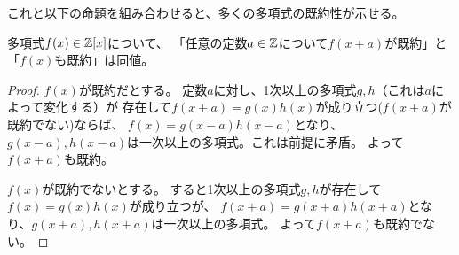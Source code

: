 \documentclass[a4j]{jarticle}
\begin{document}
これと以下の命題を組み合わせると、多くの多項式の既約性が示せる。
\begin{Prop}
多項式$f(x) \in \mathbb{Z}[x]$について、
「任意の定数$a \in \mathbb{Z}$について$f(x+a)$が既約」と「$f(x)$も既約」は同値。
\end{Prop}
\begin{proof}
$f(x)$が既約だとする。
定数$a$に対し、1次以上の多項式$g,h$（これは$a$によって変化する）が
存在して$f(x+a)=g(x)h(x)$が成り立つ($f(x+a)$が既約でない)ならば、
$f(x)=g(x-a)h(x-a)$となり、$g(x-a), h(x-a)$は一次以上の多項式。これは前提に矛盾。
よって$f(x+a)$も既約。

$f(x)$が既約でないとする。
すると1次以上の多項式$g,h$が存在して$f(x)=g(x)h(x)$が成り立つが、
$f(x+a)=g(x+a) h(x+a)$となり、$g(x+a), h(x+a)$は一次以上の多項式。
よって$f(x+a)$も既約でない。
\end{proof}
\end{document}

